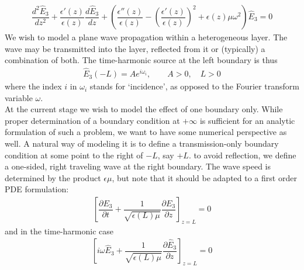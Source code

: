 \documentclass[12pt,twoside]{article}
\begin{document}
\begin{align}
\label{eqns:1-D-time-harmonic-E3_z}
\dfrac{d^2 \hat{E}_3}{d z^2} + \dfrac{\epsilon'(z)}{\epsilon(z)}\dfrac{d \hat{E}_3}{d z} + \left( \dfrac{\epsilon''(z)}{\epsilon(z)}-\left( \dfrac{\epsilon'(z)}{\epsilon(z)}\right)^2 + \epsilon(z) \mu \omega^2\right)\hat{E}_3 = 0
\end{align}
We wish to model a plane wave propagation within a heterogeneous layer. The wave may be transmitted into the layer, reflected from it or (typically) a combination of both. The time-harmonic source at the left boundary is thus
\begin{align}
\hat{E}_3(-L) = A e^{i \omega_i}, \qquad A>0, \quad L>0 
\label{eqns:1-D-time-harmonic-z-boundary-source}
\end{align}
where the index $i$ in $\omega_i$ stands for `incidence', as opposed to the Fourier transform variable $\omega$.\\
At the current stage we wish to model the effect of one boundary only. While proper determination of a boundary condition at $+\infty$ is sufficient for an analytic formulation of such a problem, we want to have some numerical perspective as well. A natural way of modeling it is to define a transmission-only boundary condition at some point to the right of $-L$, say $+L$. to avoid reflection, we define a one-sided, right traveling wave at the right boundary. The wave speed is determined by the product $\epsilon \mu$, but note that it should be adapted to a first order PDE formulation:
\begin{align}
\label{eqns:1_D-temporal-traveling-wave-bc}
\left[\dfrac{\partial E_3}{\partial t} +  \dfrac{1}{\sqrt{\epsilon(L)\mu}}\dfrac{\partial E_3}{\partial z} \right ]_{z=L} = 0
\end{align}
and in the time-harmonic case
\begin{align}
\label{eqns:1_D-time-harmonic-traveling-wave-bc}
\left[ i \omega \hat{E}_3 + \dfrac{1}{\sqrt{\epsilon(L)\mu}} \dfrac{\partial \hat{E}_3}{\partial z} \right]_{z = L}=0
\end{align}
  
\end{document}
